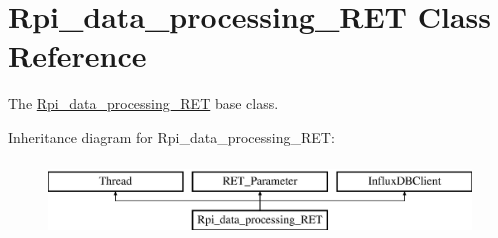 \hypertarget{a00033}{}\section{Rpi\+\_\+data\+\_\+processing\+\_\+\+R\+ET Class Reference}
\label{a00033}


The \hyperlink{a00033}{Rpi\+\_\+data\+\_\+processing\+\_\+\+R\+ET} base class.  


Inheritance diagram for Rpi\+\_\+data\+\_\+processing\+\_\+\+R\+ET\+:\begin{figure}[H]
\begin{center}
\leavevmode
\includegraphics[height=2.000000cm]{a00033}
\end{center}
\end{figure}
